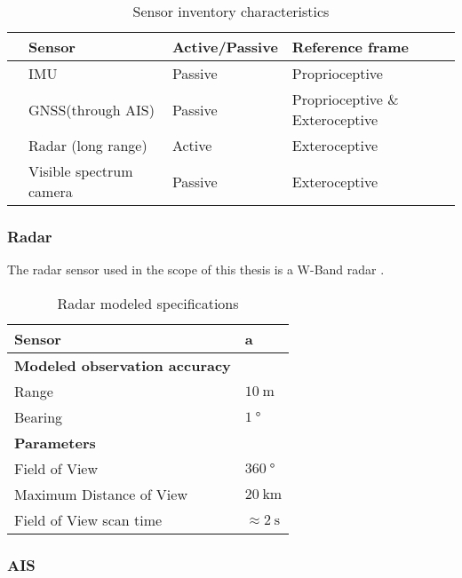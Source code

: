 \begin{table}[H]
		\centering
	\caption{Sensor inventory characteristics}
	\label{tab:sensor_active}
	\begin{tabular}{llll}
		\hline
		& \textbf{Sensor}         & \textbf{Active/Passive} & \textbf{Reference frame} \\ \hline
		& IMU                     & Passive                 & Proprioceptive                        \\ \hline
		& GNSS(through AIS)       & Passive                 & Proprioceptive \& Exteroceptive       \\ \hline
		& Radar (long range)      & Active                  & Exteroceptive                         \\ \hline
		& Visible spectrum camera & Passive                 & Exteroceptive                         \\ \hline
	\end{tabular}
\end{table}

\subsubsection{Radar}
The radar sensor used in the scope of this thesis is a W-Band radar . 


\begin{table}[]
	\centering
	\caption{Radar modeled specifications}
	\label{tab:radar_specs}
	\begin{tabular}{ll}
		\hline
		\textbf{Sensor} & a \\ \hline
		\textbf{Modeled observation accuracy} &  \\
		Range & $\SI{10}{\m}$ \\
		Bearing & $\SI{1}{\degree}$ \\ \hline
		\textbf{Parameters} &  \\
		Field of View & $\SI{360}{\degree}$ \\
		Maximum Distance of View & $\SI{20}{\km}$ \\
		Field of View scan time & $\approx \SI{2}{\second}$ \\ \hline
	\end{tabular}
\end{table}
\subsubsection{AIS}

